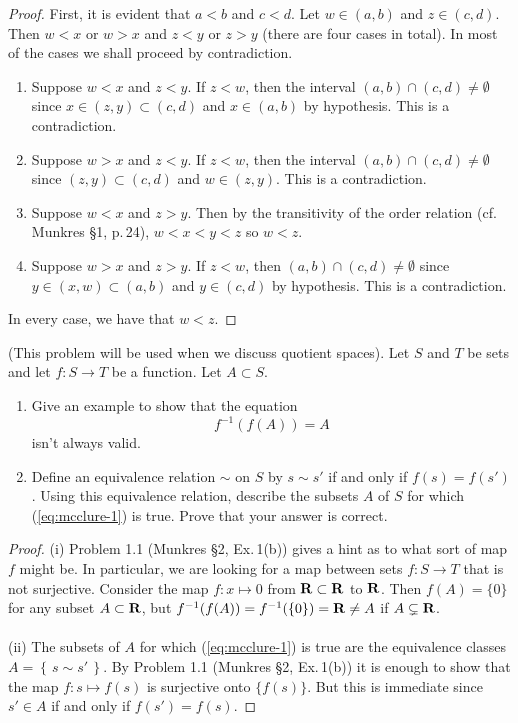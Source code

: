 \begin{proof}
First, it is evident that $a<b$ and $c<d$. Let $w\in(a,b)$ and
$z\in(c,d)$. Then $w<x$ or $w>x$ and $z<y$ or $z>y$ (there are
four cases in total). In most of the cases we shall proceed by
contradiction.
\begin{enumerate}[label=Case \arabic*:]
\item Suppose $w<x$ and $z<y$. If $z<w$, then the interval
  $(a,b)\cap (c,d)\neq\emptyset$ since $x\in (z,y)\subset (c,d)$ and
  $x\in (a,b)$ by hypothesis. This is a contradiction.
\item Suppose $w>x$ and $z<y$. If $z<w$, then the interval
  $(a,b)\cap (c,d)\neq\emptyset$ since $(z,y)\subset (c,d)$ and
  $w\in (z,y)$. This is a contradiction.
\item Suppose $w<x$ and $z>y$. Then by the transitivity of the
  order relation (cf.\,Munkres \S1, p.\,24), $w<x<y<z$ so
  $w<z$.
\item Suppose $w>x$ and $z>y$. If $z<w$, then
  $(a,b)\cap(c,d)\neq\emptyset$  since $y\in (x,w)\subset (a,b)$
  and $y\in(c,d)$ by hypothesis. This is a contradiction.
\end{enumerate}
In every case, we have that $w<z$.
\end{proof}
\newpage
\begin{problem}[C]
(This problem will be used when we discuss quotient spaces). Let
$S$ and $T$ be sets and let $f\colon S\to T$ be a function. Let
$A\subset S$.
\begin{enumerate}[noitemsep,label=(\roman*)]
\item Give an example to show that the equation
\begin{equation}
\label{eq:mcclure-1}
\tag{*}
f^{-1}(f(A))=A
\end{equation}
isn't always valid.
\item Define an equivalence relation $\sim$ on $S$ by $s\sim s'$
  if and only if $f(s)=f(s')$. Using this equivalence relation,
  describe the subsets $A$ of $S$ for which (\ref{eq:mcclure-1}) is
  true. Prove that your answer is correct.
\end{enumerate}
\end{problem}
\begin{proof}
(i) Problem 1.1 (Munkres \S2, Ex.\,1(b)) gives a hint as to what
sort of map $f$ might be. In particular, we are looking for a map
between sets $f\colon S\to T$ that is not surjective. Consider
the map $f\colon x\mapsto 0$ from $\mathbf{R}\subset\mathbf{R}$ to $\mathbf{R}$. Then
$f(A)=\{0\}$ for any subset $A\subset\mathbf{R}$, but
$f^{-1}(f(A))=f^{-1}(\{0\})=\mathbf{R}\neq A$ if $A\subsetneq\mathbf{R}$.
\\\\
(ii) The subsets of $A$ for which (\ref{eq:mcclure-1}) is true
are the equivalence classes $A=\left\{\,s\sim s'\,\right\}$. By
Problem 1.1 (Munkres \S2, Ex.\,1(b)) it is enough to show that
the map $f\colon s\mapsto f(s)$ is surjective onto
$\{f(s)\}$. But this is immediate since $s'\in A$ if and only if
$f(s')=f(s)$.
\end{proof}


